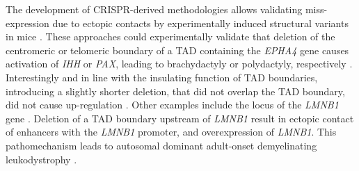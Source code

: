 \documentclass[a4paper,twoside=true,openright,parskip=full,chapterprefix=true,11pt,headings=normal,bibliography=totoc,listof=totoc,titlepage=on,captions=tableabove,draft=false]{scrreprt}
\theoremstyle{definition}
\theoremstyle{definition}
\theoremstyle{definition}
\theoremstyle{remark}
\begin{document}
The development of CRISPR-derived methodologies allows validating
miss-expression due to ectopic contacts by experimentally induced
structural variants in mice \citep{Kraft2015, Andrey2017}. These
approaches could experimentally validate that deletion of the
centromeric or telomeric boundary of a TAD containing the \emph{EPHA4}
gene causes activation of \emph{IHH} or \emph{PAX}, leading to
brachydactyly or polydactyly, respectively \citep{Lupianez2015}.
Interestingly and in line with the insulating function of TAD
boundaries, introducing a slightly shorter deletion, that did not
overlap the TAD boundary, did not cause up-regulation
\citep{Lupianez2015}. Other examples include the locus of the
\emph{LMNB1} gene \citep{Giorgio2015}. Deletion of a TAD boundary
upstream of \emph{LMNB1} result in ectopic contact of enhancers with the
\emph{LMNB1} promoter, and overexpression of \emph{LMNB1}. This
pathomechanism leads to autosomal dominant adult-onset demyelinating
leukodystrophy \citep{Giorgio2015}.
\end{document}
